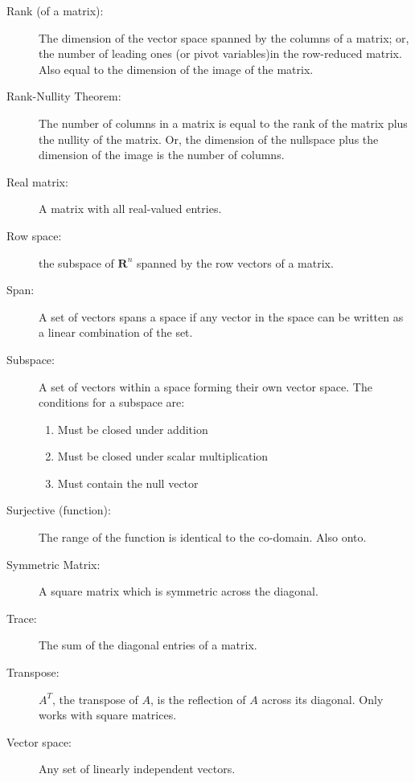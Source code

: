 \begin{description}
			\item[Rank (of a matrix):] The dimension of the vector space spanned by the columns of a matrix; or, the number of leading ones (or pivot variables)in the row-reduced matrix.
			Also equal to the dimension of the image of the matrix.
			
			\item[Rank-Nullity Theorem:] The number of columns in a matrix is equal to the rank of the matrix plus the nullity of the matrix. 
			Or, the dimension of the nullspace plus the dimension of the image is the number of columns.
			
			\item[Real matrix:] A matrix with all real-valued entries.
			
			\item[Row space:] the subspace of $\mathbf{R}^n$ spanned by the row vectors of a matrix.
			
			\item[Span:] A set of vectors spans a space if any vector in the space can be written as a linear combination of the set.
			
			\item[Subspace:] A set of vectors within a space forming their own vector space. The conditions for a subspace are:
			\begin{enumerate}
				\item Must be closed under addition
				\item Must be closed under scalar multiplication
				\item Must contain the null vector
			\end{enumerate}
			
			\item[Surjective (function):] The range of the function is identical to the co-domain. Also onto.
			
			\item[Symmetric Matrix:] A square matrix which is symmetric across the diagonal.
			
			\item[Trace:] The sum of the diagonal entries of a matrix.
			
			\item[Transpose:] $A^T$, the transpose of $A$, is the reflection of $A$ across its diagonal. Only works with square matrices.
			
			\item[Vector space:] Any set of linearly independent vectors.
			
		\end{description}
